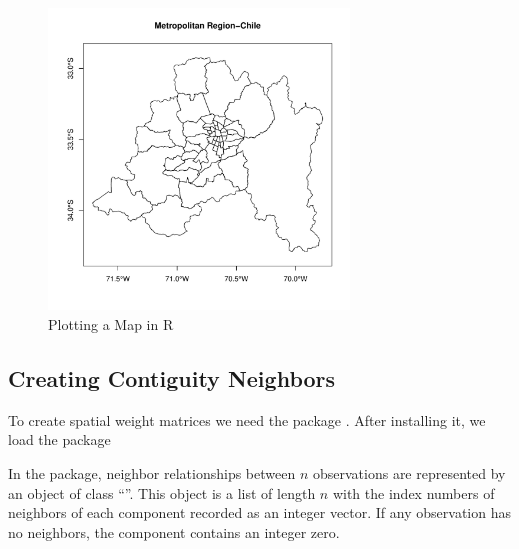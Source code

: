 \begin{figure}[h]
  \caption{Plotting a Map in R}
    \label{fig:plot_mr}
\begin{knitrout}
\color{fgcolor}

{\centering \includegraphics[width=8cm,height=8cm]{figure/plot_mr-1} 

}


\end{knitrout}
\end{figure}

\subsection{Creating Contiguity Neighbors}

To create spatial weight matrices we need the  package \citep{bivand2013computing}. After installing it, we load the package

\begin{knitrout}
\color{fgcolor}\begin{kframe}
\begin{alltt}
\hlstd{(}\hlstd{)}
\end{alltt}
\end{kframe}
\end{knitrout}

In the  package, neighbor relationships between $n$ observations are represented by an object of class ``''. This object is a list of length $n$ with the index numbers of neighbors of each component recorded as an integer vector. If any observation has no neighbors, the component contains an integer zero. 


